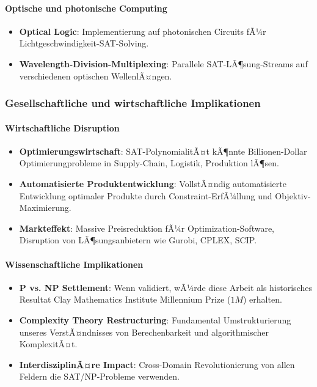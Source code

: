 ﻿\documentclass[a4paper,12pt]{article}
\theoremstyle{definition}
\begin{document}
\paragraph{Optische und photonische Computing}

\begin{itemize}
	\item \textbf{Optical Logic}: Implementierung auf photonischen Circuits fÃ¼r Lichtgeschwindigkeit-SAT-Solving.
	
	\item \textbf{Wavelength-Division-Multiplexing}: Parallele SAT-LÃ¶sung-Streams auf verschiedenen optischen WellenlÃ¤ngen.
\end{itemize}

\subsubsection{Gesellschaftliche und wirtschaftliche Implikationen}

\paragraph{Wirtschaftliche Disruption}

\begin{itemize}
	\item \textbf{Optimierungswirtschaft}: SAT-PolynomialitÃ¤t kÃ¶nnte Billionen-Dollar Optimierungprobleme in Supply-Chain, Logistik, Produktion lÃ¶sen.
	
	\item \textbf{Automatisierte Produktentwicklung}: VollstÃ¤ndig automatisierte Entwicklung optimaler Produkte durch Constraint-ErfÃ¼llung und Objektiv-Maximierung.
	
	\item \textbf{Markteffekt}: Massive Preisreduktion fÃ¼r Optimization-Software, Disruption von LÃ¶sungsanbietern wie Gurobi, CPLEX, SCIP.
\end{itemize}

\paragraph{Wissenschaftliche Implikationen}

\begin{itemize}
	\item \textbf{P vs. NP Settlement}: Wenn validiert, wÃ¼rde diese Arbeit als historisches Resultat Clay Mathematics Institute Millennium Prize ($1M$) erhalten.
	
	\item \textbf{Complexity Theory Restructuring}: Fundamental Umstrukturierung unseres VerstÃ¤ndnisses von Berechenbarkeit und algorithmischer KomplexitÃ¤t.
	
	\item \textbf{InterdisziplinÃ¤re Impact}: Cross-Domain Revolutionierung von allen Feldern die SAT/NP-Probleme verwenden.
\end{itemize}
\end{document}
